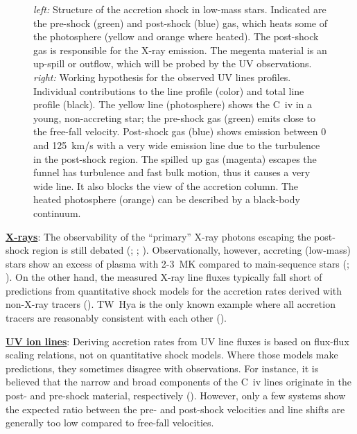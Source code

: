 \documentclass[letterpaper,11pt,twocolumn]{article}
\begin{document}
\begin{figure}
\centering
{}
\caption{\label{fig:CIVsketch} \emph{left:} Structure of the accretion
  shock in low-mass stars. Indicated are the pre-shock (green) and
  post-shock (blue) gas, which heats some of the photosphere (yellow
  and orange where heated). The post-shock gas is responsible for the
  X-ray emission. The megenta material is an up-spill or outflow,
  which will be probed by the UV observations.  
  \emph{right:}
  Working hypothesis for the observed UV lines profiles.
  Individual contributions to the line profile (color) and total line
  profile (black). The yellow line (photosphere) shows the C~{\sc iv} in a
  young, non-accreting star; the pre-shock gas (green) emits close
  to the free-fall velocity. Post-shock gas (blue) shows
  emission between 0 and 125~km/s with a very wide emission line due
  to the turbulence in the post-shock region. The
  spilled up gas (magenta) escapes the funnel has turbulence and fast bulk
  motion, thus it causes a very wide line. It also blocks the view of
  the accretion column. The heated photosphere (orange)
  can be described by a black-body
  continuum.}
\end{figure}


\underline{\bf X-rays}: The observability of the ``primary'' X-ray photons 
escaping the post-shock region is still debated 
(; ; ). Observationally, 
however, accreting (low-mass) stars show  an excess of plasma with 2-3~MK
compared to main-sequence stars (; ).
On the other hand, the measured X-ray line fluxes typically fall short of
predictions from quantitative shock models for the accretion rates derived with non-X-ray tracers (). TW~Hya is the only known example where all accretion tracers are reasonably consistent with each other (). 


\underline{\bf UV ion lines}:  Deriving  accretion rates from UV line fluxes is based 
on flux-flux scaling relations, not on quantitative shock models. Where those models make predictions, they sometimes disagree with observations. For instance, it is believed that the  narrow and 
broad components of the C~{\sc iv} lines  originate in the post- and 
pre-shock material, respectively (). However, only a few systems show the
expected ratio between the pre- and post-shock velocities and line
shifts are generally too low compared to free-fall velocities. 
\end{document}
